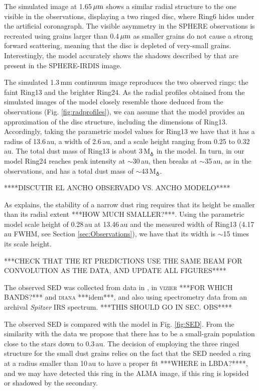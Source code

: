 \documentclass[letters,usenatbib,times]{mnras}
\begin{document}
The simulated image at 1.65\,$\hbox{$\mu$m}$ shows a similar radial structure to the one visible in the observations, displaying a two ringed disc, where Ring6 hides under the artificial coronagraph. The visible asymmetry in the SPHERE observations is recreated using grains larger than 0.4\,$\hbox{$\mu$m}$ as smaller grains do not cause a strong forward scattering, meaning that the disc is depleted of very-small grains. Interestingly, the model accurately shows the shadows described by \citet{dOrazi} that are present in the SPHERE-IRDIS image.

The simulated 1.3\,mm continuum image  reproduces the two observed rings: the faint Ring13 and the  brighter Ring24. As the radial profiles obtained from the simulated images of the model closely resemble those deduced from the observations (Fig. \ref{fig:radprofiles}), we can assume that the model provides an approximation of the disc structure, including the dimensions of  Ring13. Accordingly, taking the parametric model values for Ring13 we have that it has a radius of  13.6\,au,  a  width of 2.6\,au, and a  scale height ranging from 0.25 to 0.32\,au. The total dust mass of Ring13 is  about 3\,M$_{\earth}$ in the model.  In turn, in our model Ring24 reaches peak intensity at $\sim$30\,au, then  breaks  at $\sim$35\,au, as in the observations, and has a total dust  mass of $\sim$43\,M$_{\earth}$. 

****DISCUTIR EL ANCHO OBSERVADO VS. ANCHO MODELO**** 

As \citet{2018ApJ...869L..46D} explains, the stability of a narrow dust ring requires that its  height be smaller than its  radial extent ***HOW MUCH SMALLER?***. Using the parametric model scale height of 0.28\,au at 13.46\,au and the measured width of Ring13 (4.17\,au FWHM, see Section \ref{sec:Observations}), we have that its width is $\sim$15 times its scale height.

***CHECK THAT THE RT PREDICTIONS USE THE SAME BEAM FOR CONVOLUTION AS THE DATA, AND UPDATE ALL FIGURES****


The observed SED was collected from data  in \citet{Jensen_97}, in \textsc{vizier} ***FOR WHICH BANDS?***  and \textsc{diana} ***idem***, and also using spectrometry data from an archival \textit{Spitzer} IRS spectrum.   ***THIS SHOULD GO IN SEC. OBS**** 

The observed SED is compared with the model in Fig. \ref{fig:SED}. From the similarity with the data we propose that there has to be a small-grain population close to the stars down to 0.3\,au. The decision of employing the three ringed structure for the small dust grains relies on the fact that the SED needed a ring at a radius smaller than 10\,au to have a proper fit ***WHERE in LBDA?****, and we may have detected this ring in the ALMA image, if this ring is  lopsided or shadowed by the secondary. 
\end{document}
